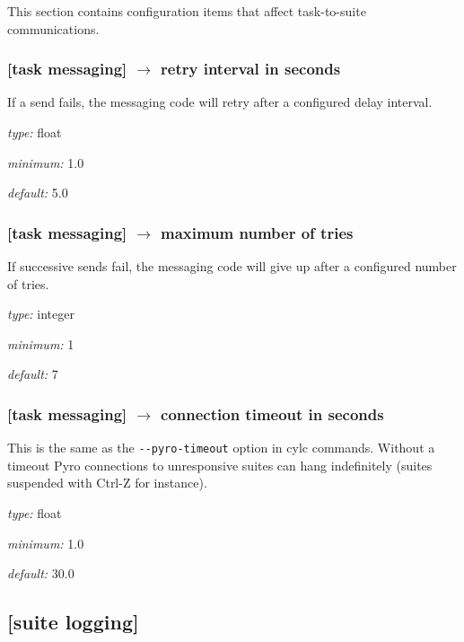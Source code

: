 This section contains configuration items that affect task-to-suite
communications.

\subsubsection[retry interval in seconds]{[task messaging] $\rightarrow$ retry interval in seconds}

If a send fails, the messaging code will retry after a configured
delay interval.

\begin{myitemize}
\item {\em type:} float
\item {\em minimum:} 1.0
\item {\em default:} 5.0
\end{myitemize}

\subsubsection[maximum number of tries]{[task messaging] $\rightarrow$ maximum number of tries}

If successive sends fail, the messaging code will give up after a
configured number of tries. 

\begin{myitemize}
\item {\em type:} integer
\item {\em minimum:} 1
\item {\em default:} 7
\end{myitemize}

\subsubsection[connection timeout in seconds]{[task messaging] $\rightarrow$ connection timeout in seconds}

This is the same as the \lstinline=--pyro-timeout= option in cylc
commands. Without a timeout Pyro connections to unresponsive
suites can hang indefinitely (suites suspended with Ctrl-Z for instance).

\begin{myitemize}
\item {\em type:} float
\item {\em minimum:} 1.0
\item {\em default:} 30.0
\end{myitemize}

\subsection{[suite logging]}

